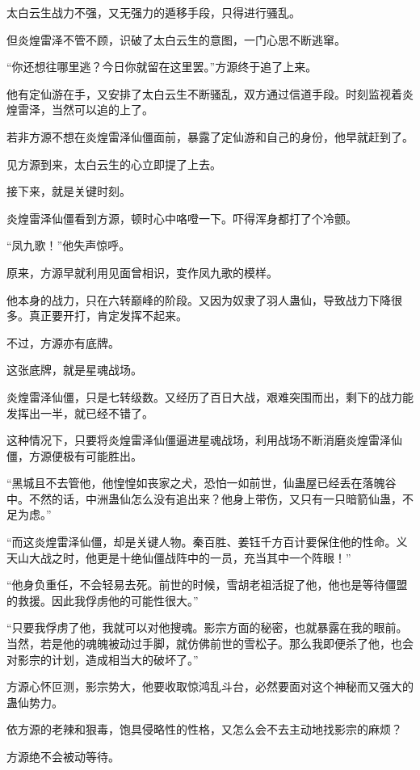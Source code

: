 \begin{this_body}
太白云生战力不强，又无强力的遁移手段，只得进行骚乱。

但炎煌雷泽不管不顾，识破了太白云生的意图，一门心思不断逃窜。

“你还想往哪里逃？今日你就留在这里罢。”方源终于追了上来。

他有定仙游在手，又安排了太白云生不断骚乱，双方通过信道手段。时刻监视着炎煌雷泽，当然可以追的上了。

若非方源不想在炎煌雷泽仙僵面前，暴露了定仙游和自己的身份，他早就赶到了。

见方源到来，太白云生的心立即提了上去。

接下来，就是关键时刻。

炎煌雷泽仙僵看到方源，顿时心中咯噔一下。吓得浑身都打了个冷颤。

“凤九歌！”他失声惊呼。

原来，方源早就利用见面曾相识，变作凤九歌的模样。

他本身的战力，只在六转巅峰的阶段。又因为奴隶了羽人蛊仙，导致战力下降很多。真正要开打，肯定发挥不起来。

不过，方源亦有底牌。

这张底牌，就是星魂战场。

炎煌雷泽仙僵，只是七转级数。又经历了百日大战，艰难突围而出，剩下的战力能发挥出一半，就已经不错了。

这种情况下，只要将炎煌雷泽仙僵逼进星魂战场，利用战场不断消磨炎煌雷泽仙僵，方源便极有可能胜出。

“黑城且不去管他，他惶惶如丧家之犬，恐怕一如前世，仙蛊屋已经丢在落魄谷中。不然的话，中洲蛊仙怎么没有追出来？他身上带伤，又只有一只暗箭仙蛊，不足为虑。”

“而这炎煌雷泽仙僵，却是关键人物。秦百胜、姜钰千方百计要保住他的性命。义天山大战之时，他更是十绝仙僵战阵中的一员，充当其中一个阵眼！”

“他身负重任，不会轻易去死。前世的时候，雪胡老祖活捉了他，他也是等待僵盟的救援。因此我俘虏他的可能性很大。”

“只要我俘虏了他，我就可以对他搜魂。影宗方面的秘密，也就暴露在我的眼前。当然，若是他的魂魄被动过手脚，就仿佛前世的雪松子。那么我即便杀了他，也会对影宗的计划，造成相当大的破坏了。”

方源心怀叵测，影宗势大，他要收取惊鸿乱斗台，必然要面对这个神秘而又强大的蛊仙势力。

依方源的老辣和狠毒，饱具侵略性的性格，又怎么会不去主动地找影宗的麻烦？

方源绝不会被动等待。


\end{this_body}

